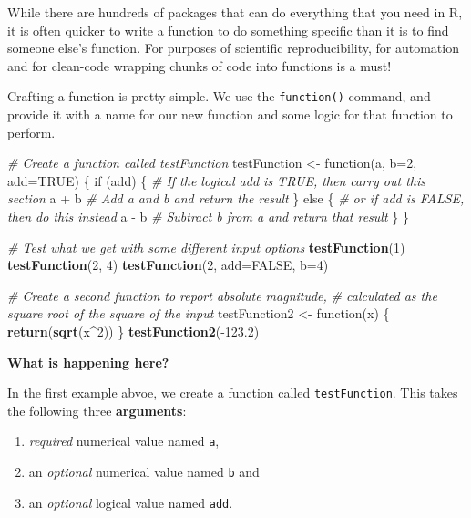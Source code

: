 \documentclass[a4paper]{book}
\newenvironment{Shaded}{\begin{snugshade}}{\end{snugshade}}
\newcommand{\KeywordTok}[1]{\textcolor[rgb]{0.13,0.29,0.53}{\textbf{{#1}}}}
\newcommand{\DataTypeTok}[1]{\textcolor[rgb]{0.13,0.29,0.53}{{#1}}}
\newcommand{\DecValTok}[1]{\textcolor[rgb]{0.00,0.00,0.81}{{#1}}}
\newcommand{\FloatTok}[1]{\textcolor[rgb]{0.00,0.00,0.81}{{#1}}}
\newcommand{\StringTok}[1]{\textcolor[rgb]{0.31,0.60,0.02}{{#1}}}
\newcommand{\CommentTok}[1]{\textcolor[rgb]{0.56,0.35,0.01}{\textit{{#1}}}}
\newcommand{\OtherTok}[1]{\textcolor[rgb]{0.56,0.35,0.01}{{#1}}}
\newcommand{\NormalTok}[1]{{#1}}
\providecommand{\tightlist}{%
  \setlength{\itemsep}{0pt}\setlength{\parskip}{0pt}}
\renewenvironment{Shaded}
{\vspace{1.5em}\begin{leftbar}\begin{snugshade}}
{\end{snugshade}\end{leftbar}\vspace{3pt}}
\begin{document}
While there are hundreds of packages that can do everything that you
need in R, it is often quicker to write a function to do something
specific than it is to find someone else's function. For purposes of
scientific reproducibility, for automation and for clean-code wrapping
chunks of code into functions is a must!

Crafting a function is pretty simple. We use the \texttt{function()}
command, and provide it with a name for our new function and some logic
for that function to perform.

\begin{Shaded}
\begin{Highlighting}[]
\CommentTok{# Create a function called testFunction}
\NormalTok{testFunction <-}\StringTok{ }\NormalTok{function(a, }\DataTypeTok{b=}\DecValTok{2}\NormalTok{, }\DataTypeTok{add=}\OtherTok{TRUE}\NormalTok{) \{}
  \NormalTok{if (add) \{  }\CommentTok{# If the logical add is TRUE, then carry out this section}
    \NormalTok{a +}\StringTok{ }\NormalTok{b     }\CommentTok{# Add a and b and return the result}
  \NormalTok{\} else \{    }\CommentTok{# or if add is FALSE, then do this instead}
    \NormalTok{a -}\StringTok{ }\NormalTok{b     }\CommentTok{# Subtract b from a and return that result}
  \NormalTok{\}}
\NormalTok{\}}

\CommentTok{# Test what we get with some different input options}
\KeywordTok{testFunction}\NormalTok{(}\DecValTok{1}\NormalTok{)}
\KeywordTok{testFunction}\NormalTok{(}\DecValTok{2}\NormalTok{, }\DecValTok{4}\NormalTok{)}
\KeywordTok{testFunction}\NormalTok{(}\DecValTok{2}\NormalTok{, }\DataTypeTok{add=}\OtherTok{FALSE}\NormalTok{, }\DataTypeTok{b=}\DecValTok{4}\NormalTok{)}

\CommentTok{# Create a second function to report absolute magnitude,}
\CommentTok{# calculated as the square root of the square of the input}
\NormalTok{testFunction2 <-}\StringTok{ }\NormalTok{function(x) \{}
  \KeywordTok{return}\NormalTok{(}\KeywordTok{sqrt}\NormalTok{(x^}\DecValTok{2}\NormalTok{))}
\NormalTok{\}}
\KeywordTok{testFunction2}\NormalTok{(-}\FloatTok{123.2}\NormalTok{)}
\end{Highlighting}
\end{Shaded}

\textbf{What is happening here?}

In the first example abvoe, we create a function called
\texttt{testFunction}. This takes the following three
\textbf{arguments}:

\begin{enumerate}
\def\labelenumi{(\roman{enumi})}
\tightlist
\item
  \emph{required} numerical value named \texttt{a},
\item
  an \emph{optional} numerical value named \texttt{b} and
\item
  an \emph{optional} logical value named \texttt{add}.
\end{enumerate}
\end{document}
